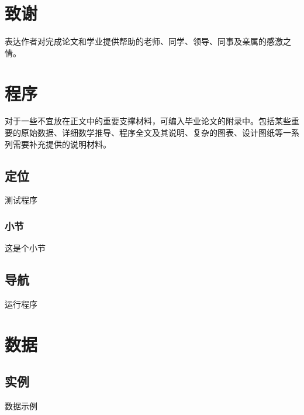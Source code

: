 \documentclass[a4paper,fancyhdr,fntef,UTF8,hyperref,openany,oneside,notitlepage]{book}%
\begin{document}
\chapter*{致谢}

表达作者对完成论文和学业提供帮助的老师、同学、领导、同事及亲属的感激之情。

\clearpage
\appendix

\chapter{程序}
对于一些不宜放在正文中的重要支撑材料，可编入毕业论文的附录中。包括某些重要的原始数据、详细数学推导、程序全文及其说明、复杂的图表、设计图纸等一系列需要补充提供的说明材料。
\section{定位}
测试程序
\subsection{小节}
这是个小节
\section{导航}
运行程序

\chapter{数据}
\section{实例}
数据示例
\end{document}
